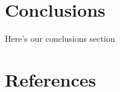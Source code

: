 \documentclass[
  letterpaper,
  DIV=11,
  numbers=noendperiod]{scrreprt}
\newlength{\cslhangindent}
\newenvironment{CSLReferences}[2] %
 {\begin{list}{}{%
  \setlength{\itemindent}{0pt}
  \setlength{\leftmargin}{0pt}
  \setlength{\parsep}{0pt}
  \ifodd #1
   \setlength{\leftmargin}{\cslhangindent}
   \setlength{\itemindent}{-1\cslhangindent}
  \fi
  \setlength{\itemsep}{#2\baselineskip}}}
 {\end{list}}
\begin{document}

\chapter{Conclusions}\label{sec-conclusions}

Here's our conclusions section


\chapter*{References}\label{references}


\label{refs}
\begin{CSLReferences}{0}{1}
\end{CSLReferences}
\end{document}
